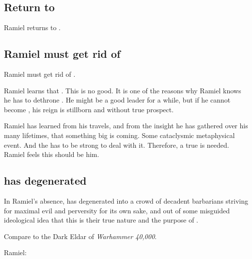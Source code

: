 \begin{garbage}
\section{Return to \Mystraacht}
Ramiel returns to \Mystraacht. 






\subsection{Ramiel must get rid of \Dasteron}
Ramiel must get rid of \Dasteron. 

Ramiel learns that . 
This is no good. 
It is one of the reasons why Ramiel knows he has to dethrone \Dasteron. 
He might be a good leader for a while, but if he cannot become \apex{}, his reign is stillborn and without true prospect. 

Ramiel has learned from his travels, and from the insight he has gathered over his many lifetimes, that something big is coming. 
Some cataclysmic metaphysical event. 
And the \Mystraacht{} \matrix{} has to be strong to deal with it. 
Therefore, a true \apex{} is needed. 
Ramiel feels this \apex{} should be him. 





\subsection{\Mystraacht{} has degenerated}
In Ramiel's absence, \Mystraacht{} has degenerated into a crowd of decadent barbarians striving for maximal evil and perversity for its own sake, and out of some misguided ideological idea that this is their true nature and the purpose of \Mystraacht. 

Compare to the Dark Eldar of \emph{Warhammer 40,000}.

Ramiel: 


\end{garbage}
